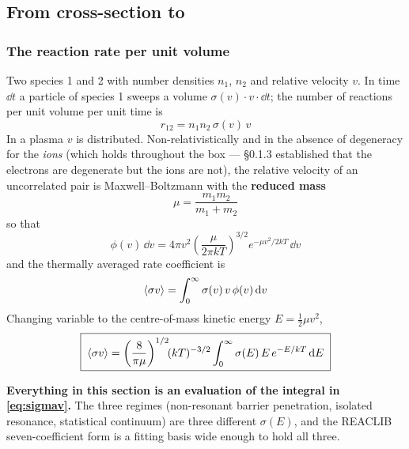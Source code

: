 \subsection{From cross-section to \texorpdfstring{\sigv}{<sigma v>}}
\label{sec:sigmav}

\subsubsection{The reaction rate per unit volume}
\label{sec:rate-per-volume}

Two species 1 and 2 with number densities $n_1$, $n_2$ and relative velocity
$v$. In time $\dd t$ a particle of species 1 sweeps a volume
$\sigma(v)\cdot v\cdot \dd t$; the number of reactions per unit volume per unit
time is
%
\begin{equation*}
r_{12} = n_1 n_2 \,\sigma(v)\,v
\end{equation*}
%
In a plasma $v$ is distributed. Non-relativistically and in the absence of
degeneracy for the \emph{ions} (which holds throughout the box --- \S0.1.3
established that the electrons are degenerate but the ions are not), the
relative velocity of an uncorrelated pair is Maxwell--Boltzmann with the
\textbf{reduced mass} \citep[eq.~4]{adelberger2011}
%
\begin{equation*}
\mu = \frac{m_1 m_2}{m_1+m_2}
\end{equation*}
%
so that
%
\begin{equation*}
\phi(v)\,\dd v = 4\pi v^2 \left(\frac{\mu}{2\pi kT}\right)^{3/2}
              e^{-\mu v^2/2kT}\,\dd v
\end{equation*}
%
and the thermally averaged rate coefficient is
\citep{rauscher2000,adelberger2011}
%
\begin{equation*}
\langle\sigma v\rangle = \int_0^\infty \sigma(v)\,v\,\phi(v)\,\mathrm{d} v
\end{equation*}
%
Changing variable to the centre-of-mass kinetic energy $E = \tfrac12\mu v^2$,
%
\begin{equation}
\boxed{\;
\langle\sigma v\rangle
= \left(\frac{8}{\pi\mu}\right)^{1/2}\!\!(kT)^{-3/2}
  \int_0^\infty \sigma(E)\,E\,e^{-E/kT}\,\mathrm{d} E
\;}
\label{eq:sigmav}
\end{equation}

\textbf{Everything in this section is an evaluation of the integral in
\eqref{eq:sigmav}.} The three regimes (non-resonant barrier penetration,
isolated resonance, statistical continuum) are three different $\sigma(E)$, and
the REACLIB seven-coefficient form is a fitting basis wide enough to hold all
three.

